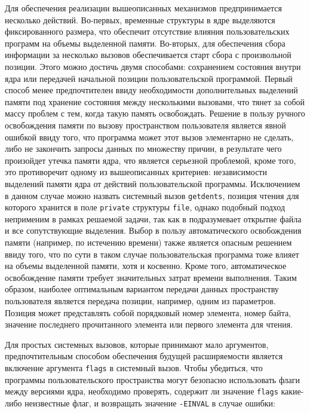 Для обеспечения реализации вышеописанных механизмов предпринимается несколько
действий. Во-первых, временные структуры в ядре выделяются фиксированного
размера, что обеспечит отсутствие влияния пользовательских программ на объемы
выделенной памяти. Во-вторых, для обеспечения сбора информации за несколько
вызовов обеспечивается старт сбора с произвольной позиции. Этого можно достичь
двумя способами: сохранением состояния внутри ядра или передачей начальной
позиции пользовательской программой. Первый способ менее предпочтителен ввиду
необходимости дополнительных выделений памяти под хранение состояния между
несколькими вызовами, что тянет за собой массу проблем с тем, когда такую память
освобождать. Решение в пользу ручного освобождения памяти по вызову
пространством пользователя является явной ошибкой ввиду того, что программа
может этот вызов элементарно не сделать, либо не закончить запросы данных по
множеству причин, в результате чего произойдет утечка памяти ядра, что является
серьезной проблемой, кроме того, это противоречит одному из вышеописанных
критериев: независимости выделений памяти ядра от действий пользовательской
программы. Исключением в данном случае можно назвать системный вызов
\texttt{getdents}, позиция чтения для которого хранится в поле \texttt{private}
структуры \texttt{file}, однако подобный подход неприменим в рамках решаемой
задачи, так как в подразумевает открытие файла и все сопутствующие выделения.
Выбор в пользу автоматического освобождения памяти (например, по
истечению времени) также является опасным решением ввиду того, что по сути в
таком случае пользовательская программа тоже влияет на объемы выделенной памяти,
хотя и косвенно. Кроме того, автоматическое освобождение памяти требует
значительных затрат времени выполнения. Таким образом, наиболее оптимальным
вариантом передачи данных пространству пользователя является передача позиции,
например, одним из параметров. Позиция может представлять собой порядковый номер
элемента, номер байта, значение последнего прочитанного элемента или первого
элемента для чтения.

Для простых системных вызовов, которые принимают мало аргументов,
предпочтительным способом обеспечения будущей расширяемости является включение
аргумента \texttt{flags} в системный вызов. Чтобы убедиться, что программы
пользовательского пространства могут безопасно использовать флаги между версиями
ядра, необходимо проверять, содержит ли значение \texttt{flags} какие-либо
неизвестные флаг, и возвращать значение \texttt{-EINVAL} в случае ошибки:

